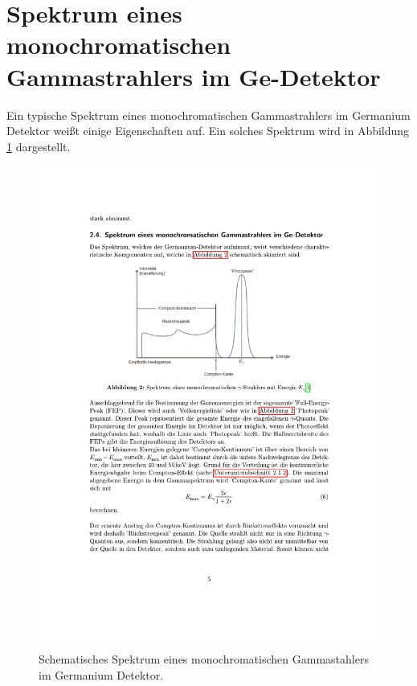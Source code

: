 \section{Spektrum eines monochromatischen Gammastrahlers im Ge-Detektor}
\label{sec:spektrum}
Ein typische Spektrum eines monochromatischen Gammastrahlers im Germanium Detektor weißt einige Eigenschaften auf. Ein solches Spektrum wird in Abbildung \ref{fig:gammaspektrum} 
dargestellt.

\begin{figure}
    \centering
    \includegraphics[width = .8\textwidth]{content/pics/gammspektrum.pdf}
    \caption{Schematisches Spektrum eines monochromatischen Gammastahlers im Germanium Detektor.}
    \label{fig:gammaspektrum}
\end{figure}

